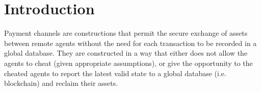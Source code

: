 \section{Introduction}
  Payment channels are constructions that permit the secure exchange of assets between
  remote agents without the need for each transaction to be recorded in a global database.
  They are constructed in a way that either does not allow the agents to cheat (given
  appropriate assumptions), or give the opportunity to the cheated agents to report the
  latest valid state to a global database (i.e. blockchain) and reclaim their assets.
